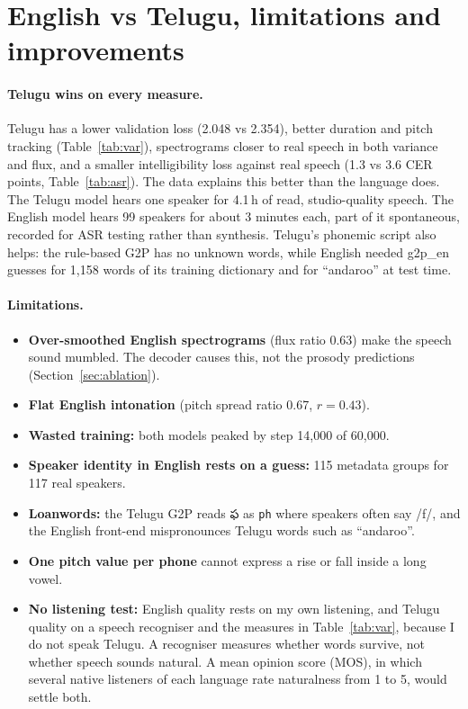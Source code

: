 \documentclass[11pt,a4paper]{article}
\newcommand{\tel}[1]{{\te #1}}
\newcommand{\code}[1]{\texttt{#1}}
\begin{document}
\section{English vs Telugu, limitations and improvements}
\label{sec:cmp}
\paragraph{Telugu wins on every measure.} Telugu has a lower validation loss (2.048 vs 2.354), better duration and
pitch tracking (Table~\ref{tab:var}), spectrograms closer to real speech in both variance and flux, and a smaller
intelligibility loss against real speech (1.3 vs 3.6 CER points, Table~\ref{tab:asr}). The data
explains this better than the language does. The Telugu model hears one speaker for 4.1\,h of read, studio-quality
speech. The English model hears 99 speakers for about 3 minutes each, part of it spontaneous, recorded for ASR
testing rather than synthesis. Telugu's phonemic script also helps: the rule-based G2P has no unknown words, while
English needed g2p\_en guesses for 1,158 words of its training dictionary and for ``andaroo'' at test time.

\paragraph{Limitations.}
\begin{itemize}
\item \textbf{Over-smoothed English spectrograms} (flux ratio 0.63) make the speech sound mumbled. The decoder
causes this, not the prosody predictions (Section~\ref{sec:ablation}).
\item \textbf{Flat English intonation} (pitch spread ratio 0.67, $r = 0.43$).
\item \textbf{Wasted training:} both models peaked by step 14,000 of 60,000.
\item \textbf{Speaker identity in English rests on a guess:} 115 metadata groups for 117 real speakers.
\item \textbf{Loanwords:} the Telugu G2P reads \tel{ఫ} as \code{ph} where speakers often say /f/, and the English
front-end mispronounces Telugu words such as ``andaroo''.
\item \textbf{One pitch value per phone} cannot express a rise or fall inside a long vowel.
\item \textbf{No listening test:} English quality rests on my own listening, and Telugu quality on a speech
recogniser and the measures in Table~\ref{tab:var}, because I do not speak Telugu. A recogniser measures whether
words survive, not whether speech sounds natural. A mean opinion score (MOS), in which several native listeners of each language
rate naturalness from 1 to 5, would settle both.
\end{itemize}
\end{document}
